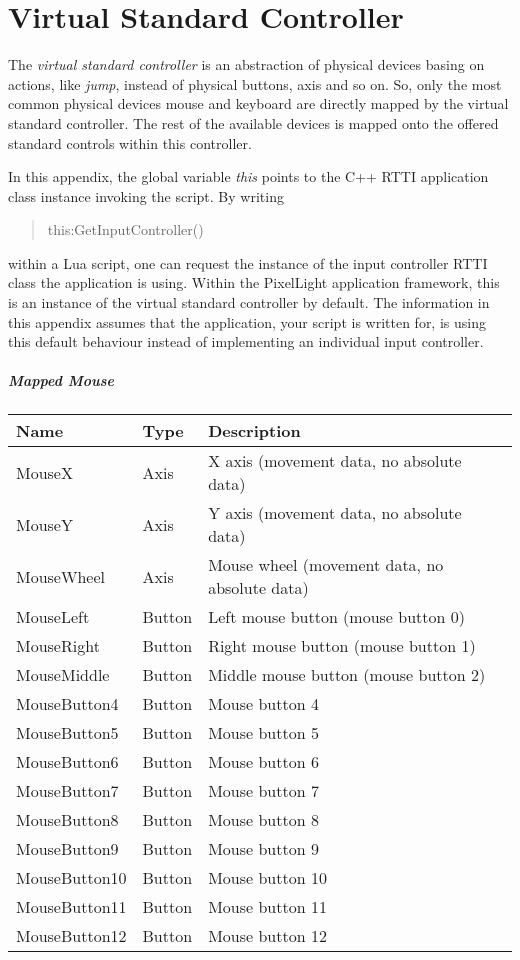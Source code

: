 \chapter{Virtual Standard Controller}
\label{Appendix:VirtualStandardController}
The \emph{virtual standard controller} is an abstraction of physical devices basing on actions, like \emph{jump}, instead of physical buttons, axis and so on. So, only the most common physical devices mouse and keyboard are directly mapped by the virtual standard controller. The rest of the available devices is mapped onto the offered standard controls within this controller.

In this appendix, the global variable \emph{this} points to the C++ \ac{RTTI} application class instance invoking the script. By writing \begin{quote}this:GetInputController()\end{quote} within a Lua script, one can request the instance of the input controller \ac{RTTI} class the application is using. Within the PixelLight application framework, this is an instance of the virtual standard controller by default. The information in this appendix assumes that the application, your script is written for, is using this default behaviour instead of implementing an individual input controller.


\paragraph{Mapped Mouse}
\begin{center}
	\centering
	\begin{longtable}{ | l | l | p{9cm} |}
	\hline
	Name			&	Type	&	Description\\ \hline
	MouseX			&	Axis	&	X axis (movement data, no absolute data)\\
	MouseY			&	Axis	&	Y axis (movement data, no absolute data)\\
	MouseWheel		&	Axis	&	Mouse wheel (movement data, no absolute data)\\
	MouseLeft		&	Button	&	Left mouse button (mouse button 0)\\
	MouseRight		&	Button	&	Right mouse button (mouse button 1)\\
	MouseMiddle		&	Button	&	Middle mouse button (mouse button 2)\\
	MouseButton4	&	Button	&	Mouse button 4\\
	MouseButton5	&	Button	&	Mouse button 5\\
	MouseButton6	&	Button	&	Mouse button 6\\
	MouseButton7	&	Button	&	Mouse button 7\\
	MouseButton8	&	Button	&	Mouse button 8\\
	MouseButton9	&	Button	&	Mouse button 9\\
	MouseButton10	&	Button	&	Mouse button 10\\
	MouseButton11	&	Button	&	Mouse button 11\\
	MouseButton12	&	Button	&	Mouse button 12\\
	\hline
	\end{longtable}
\end{center}


